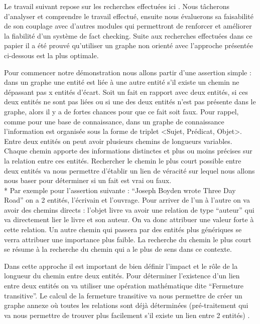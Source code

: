 Le travail suivant repose sur les recherches effectuées ici \cite{ciampaglia2015computational}. Nous tâcherons d'analyser et comprendre le travail effectué, ensuite nous évaluerons sa faisabilité de son couplage avec d'autres modules qui permettront de renforcer et améliorer la fiabilité d'un système de fact checking. Suite aux recherches effectuées dans ce papier il a été prouvé qu'utiliser un graphe non orienté avec l'approche présentée ci-dessous est la plus optimale.

Pour commencer notre démonstration nous allons partir d'une assertion simple : dans un graphe une entité est liée à une autre entité s'il existe un chemin ne dépassant pas  x entités d'écart. Soit un fait en rapport avec deux entités, si ces deux entités ne sont pas liées ou si une des deux entités n'est pas présente dans le graphe, alors il y a de fortes chances pour que ce fait soit faux. Pour rappel, comme pour une base de connaissance, dans un graphe de connaissance l'information est organisée sous la forme de triplet <Sujet, Prédicat, Objet>. Entre deux entités on peut avoir plusieurs chemins de longueurs variables. Chaque chemin apporte des informations distinctes et plus ou moins précises sur la relation entre ces entités. Rechercher le chemin le plus court possible entre deux entités va nous permettre d'établir un lien de véracité sur lequel nous allons nous baser pour déterminer si un fait est vrai ou faux.
\\*
Par exemple pour l'assertion suivante : \enquote{Joseph Boyden wrote Three Day Road} on a 2 entités, l'écrivain et l'ouvrage. Pour arriver de l'un à l'autre on va avoir des chemins directs : l'objet livre va avoir une relation de type \enquote{auteur} qui va directement lier le livre et son auteur. On va donc attribuer une valeur forte à cette relation. Un autre chemin qui passera par des entités plus génériques se verra attribuer une importance plus faible. La recherche du chemin le plus court se résume à la recherche du chemin qui a le plus de sens dans ce contexte.

Dans cette approche il est important de bien définir l'impact et le rôle de la longueur du chemin entre deux entités. Pour déterminer l'existence d'un lien entre deux entités on va utiliser une opération mathématique dite \enquote{Fermeture transitive}. Le calcul de la fermeture transitive va nous permettre de créer un graphe annexe où toutes les relations sont déjà déterminées (pré-traitement qui va nous permettre de trouver plus facilement s'il existe un lien entre 2 entités) \cite{JJLGraphes}.

